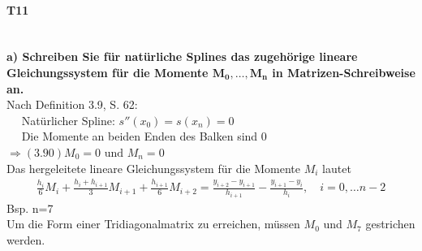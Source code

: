 \documentclass[10pt,a4paper]{article}
\begin{document}
	\paragraph{T11}\mbox{}\\
	\textbf{%
		a) Schreiben Sie für natürliche Splines das zugehörige lineare Gleichungssystem für die Momente $\mathbf{M_0, \dots, M_n}$ in Matrizen-Schreibweise an.
	}\\
		Nach Definition 3.9, S. 62:\\
		$\mbox{}\quad$ Natürlicher Spline: $s''(x_0)=s(x_n)=0$ \\
		$\mbox{}\quad$ Die Momente an beiden Enden des Balken sind 0 $\Rightarrow (3.90) M_0=0 \text{ und } M_n=0$ \\
		Das hergeleitete lineare Gleichungssystem für die Momente $M_i$ lautet
		\begin{align*}
			\frac{h_i}{6}M_i+\frac{h_i+h_{i+1}}{3}M_{i+1}+\frac{h_{i+1}}{6}M_{i+2} 
				= \frac{y_{i+2}-y_{i+1}}{h_{i+1}}-\frac{y_{i+1}-y_i}{h_i}, \quad i = 0,\dots n-2
		\end{align*}
		Bsp. n=7 \\
		Um die Form einer Tridiagonalmatrix zu erreichen, müssen $M_0$ und $M_7$ gestrichen werden.
\end{document}
